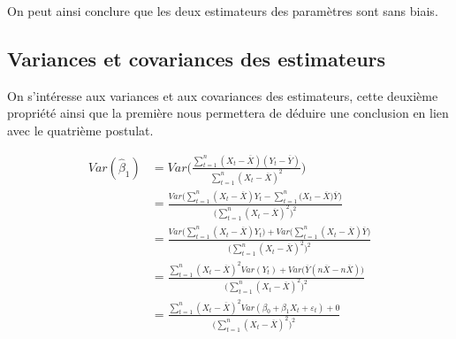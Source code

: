 \documentclass[11pt,french]{report}
\begin{document}
On peut ainsi conclure que les deux estimateurs des paramètres sont sans biais.

\subsection{Variances et covariances des estimateurs}
On s'intéresse aux variances et aux covariances des estimateurs, cette deuxième propriété ainsi que la première nous permettera de déduire une conclusion en lien avec le quatrième postulat.

\begin{align*}
Var(\hat{\beta}_1) &= Var\Bigg( \frac{\sum_{t=1}^n(X_t- \overline{X})(Y_t - \overline{Y})}{\sum_{t=1}^n(X_t - \overline{X})^2} \Bigg)\\
&= \frac{Var\big( \sum_{t=1}^n(X_t- \overline{X})Y_t - \sum_{t=1}^n(X_t- \overline{X} \big)\overline{Y}\big)}{\big( \sum_{t=1}^n(X_t - \overline{X})^2 \big)^2} \\
&= \frac{Var\big( \sum_{t=1}^n(X_t- \overline{X})Y_t\big) + Var\big(\sum_{t=1}^n(X_t- \overline{X})\overline{Y}\big)}{\big( \sum_{t=1}^n(X_t - \overline{X})^2 \big)^2} \\
&= \frac{\sum_{t=1}^n(X_t- \overline{X})^2 Var(Y_t) + Var\big(\overline{Y}(n\overline{X}- n\overline{X})\big)}{\big( \sum_{t=1}^n(X_t - \overline{X})^2 \big)^2} \\
&= \frac{\sum_{t=1}^n(X_t- \overline{X})^2 Var(\beta_0 + \beta_1X_t + \varepsilon_t) + 0}{\big( \sum_{t=1}^n(X_t - \overline{X})^2 \big)^2} \\
\end{align*}

\begin{center}
\end{center}
\end{document}
